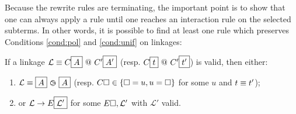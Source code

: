 


Because the rewrite rules are terminating, the important point is to show that
one can always apply a rule until one reaches an interaction rule on the
selected subterms. In other words, it is possible to find at least one rule
which preserves Conditions \ref{cond:pol} and \ref{cond:unif} on linkages:

\begin{lemma}\label{thm:vprogress} If a linkage $\mathcal{L} \equiv
  C\fbox{$A$} \operatorname{\,@\,} C'\fbox{$A'$}$ (resp. $C\fbox{$t$} \operatorname{\,@\,} C'\fbox{$t'$}$) is
  valid, then either:
  \begin{enumerate}
    \item $\mathcal{L} \equiv \fbox{$A$} \operatorname{\,\varogreaterthan\,} \fbox{$A$}$ (resp. $C\square \in \{\square
    = u, u = \square\}$ for some $u$ and $t \equiv t'$);
    \item or $\mathcal{L} \rightarrow E\fbox{$\mathcal{L'}$}$ for some $E\square,
      \mathcal{L'}$ with $\mathcal{L'}$ valid.
  \end{enumerate}
\end{lemma}

